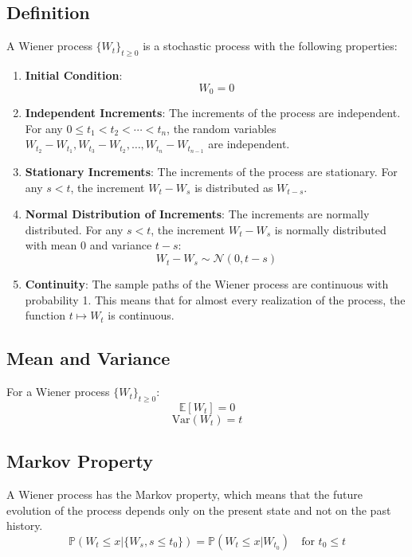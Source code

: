 \documentclass[12pt]{article}
\begin{document}
\subsection{Definition}

A Wiener process \( \{W_t\}_{t \geq 0} \) is a stochastic process with the following properties:

\begin{enumerate}
    \item \textbf{Initial Condition}:
    \[
    W_0 = 0
    \]
    \item \textbf{Independent Increments}:
    The increments of the process are independent. For any \( 0 \leq t_1 < t_2 < \cdots < t_n \), the random variables \( W_{t_2} - W_{t_1}, W_{t_3} - W_{t_2}, \ldots, W_{t_n} - W_{t_{n-1}} \) are independent.
    \item \textbf{Stationary Increments}:
    The increments of the process are stationary. For any \( s < t \), the increment \( W_t - W_s \) is distributed as \( W_{t-s} \).
    \item \textbf{Normal Distribution of Increments}:
    The increments are normally distributed. For any \( s < t \), the increment \( W_t - W_s \) is normally distributed with mean 0 and variance \( t - s \):
    \[
    W_t - W_s \sim \mathcal{N}(0, t - s)
    \]
    \item \textbf{Continuity}:
    The sample paths of the Wiener process are continuous with probability 1. This means that for almost every realization of the process, the function \( t \mapsto W_t \) is continuous.
\end{enumerate}

\subsection{Mean and Variance}

For a Wiener process \( \{W_t\}_{t \geq 0} \):
\[
\mathbb{E}[W_t] = 0
\]
\[
\text{Var}(W_t) = t
\]

\subsection{Markov Property}

A Wiener process has the Markov property, which means that the future evolution of the process depends only on the present state and not on the past history.
\[
\mathbb{P}(W_t \leq x | \{W_s, s \leq t_0\}) = \mathbb{P}(W_t \leq x | W_{t_0}) \quad \text{for } t_0 \leq t
\]
\end{document}
